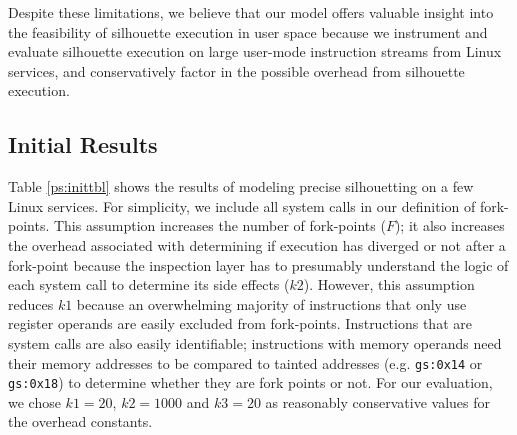 Despite these limitations, we believe
that our model offers valuable insight
into the feasibility of silhouette execution
in user space because we instrument and evaluate
silhouette execution on large user-mode
instruction streams from Linux services,
and conservatively factor in the possible overhead
from silhouette execution.

\subsection{Initial Results}
 \newline
Table \ref{ps:inittbl} shows the results of modeling 
precise silhouetting on a few Linux services.
For simplicity, we include
all system calls in our definition
of fork-points.
This assumption increases the number of fork-points ($F$);
it also increases the overhead associated with determining 
if execution has diverged or not after a fork-point
because the inspection layer has to presumably
understand the logic of each system call
to determine its side effects ($k2$). However,
this assumption reduces $k1$ because an overwhelming majority
of instructions that only use register operands are easily
excluded from fork-points. Instructions
that are system calls are also easily identifiable;
instructions with memory operands need
their memory addresses to be 
compared to tainted addresses (e.g. \texttt{gs:0x14} or \texttt{gs:0x18})
to determine whether they are fork points or not.
For our evaluation, we chose $k1 = 20$,
$k2 = 1000$ and $k3 = 20$ as reasonably
conservative values for the overhead constants.

